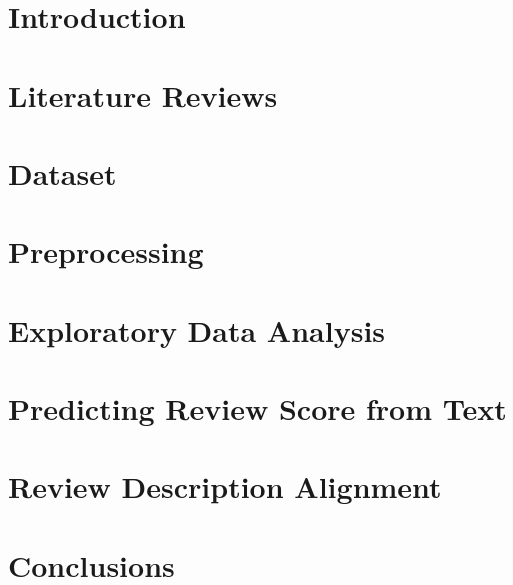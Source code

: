 \documentclass[12pt]{article}
\numberwithin{equation}{section}
\begin{document}
\section{Introduction}


\section{Literature Reviews}

\section{Dataset}



\section{Preprocessing}

\section{Exploratory Data Analysis}

\section{Predicting Review Score from Text}

\section{Review Description Alignment}

\section{Conclusions}
\vspace{1em} 


%
%

\newpage
\printbibliography[heading=bibintoc]
\end{document}

